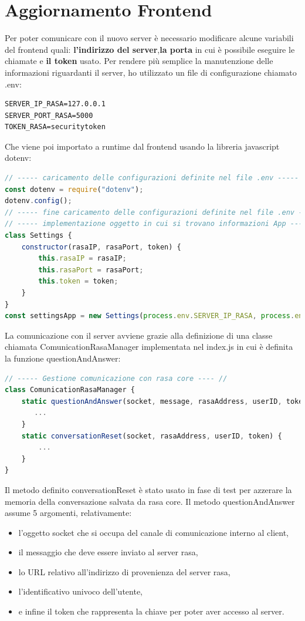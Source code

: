 \section{Aggiornamento Frontend}
Per poter comunicare con il nuovo server è necessario modificare alcune variabili del frontend quali: \textbf{l'indirizzo del server},\textbf{la porta} in cui è possibile eseguire le chiamate e \textbf{il token} usato.
Per rendere più semplice la manutenzione delle informazioni riguardanti il server, ho utilizzato un file di configurazione chiamato .env:
\begin{lstlisting}
SERVER_IP_RASA=127.0.0.1
SERVER_PORT_RASA=5000
TOKEN_RASA=securitytoken
\end{lstlisting}
Che viene poi importato a runtime dal frontend usando la libreria javascript dotenv:
\begin{lstlisting}[language=JavaScript]
// ----- caricamento delle configurazioni definite nel file .env ----- //
const dotenv = require("dotenv");
dotenv.config();
// ----- fine caricamento delle configurazioni definite nel file .env ----- //
// ----- implementazione oggetto in cui si trovano informazioni App ----- //
class Settings {
    constructor(rasaIP, rasaPort, token) {
        this.rasaIP = rasaIP;
        this.rasaPort = rasaPort;
        this.token = token;
    }
}
const settingsApp = new Settings(process.env.SERVER_IP_RASA, process.env.SERVER_PORT_RASA, process.env.TOKEN_RASA);
\end{lstlisting}
La comunicazione con il server avviene grazie alla definizione di una classe chiamata ComunicationRasaManager implementata nel index.js in cui è definita la funzione questionAndAnswer:
\begin{lstlisting}[language=JavaScript]
// ----- Gestione comunicazione con rasa core ---- //
class ComunicationRasaManager {
    static questionAndAnswer(socket, message, rasaAddress, userID, token) {
       ...
    }
    static conversationReset(socket, rasaAddress, userID, token) {
        ...
    }
}
\end{lstlisting}
Il metodo definito conversationReset è stato usato in fase di test per azzerare la memoria della conversazione salvata da rasa core.
Il metodo questionAndAnswer assume 5 argomenti, relativamente:
\begin{itemize}
\item l'oggetto socket che si occupa del canale di comunicazione interno al client,
\item il messaggio che deve essere inviato al server rasa,
\item lo URL relativo all'indirizzo di provenienza del server rasa,
\item l'identificativo univoco dell'utente,
\item e infine il token che rappresenta la chiave per poter aver accesso al server.
\end{itemize}
